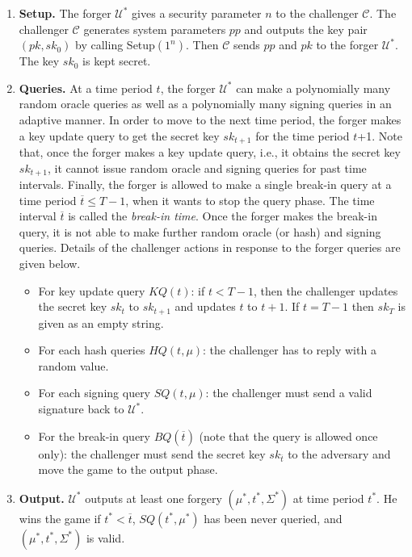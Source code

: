 \documentclass[runningheads]{llncs}
\begin{document}
\begin{enumerate}
\item \textbf{Setup.} The forger $\mathcal{U}^*$ gives a security parameter $n$ to the challenger $\mathcal{C}$. 
	The challenger $\mathcal{C}$ generates system parameters $pp$ and outputs the key pair $(pk, sk_0)$ 
	by calling \textsf{Setup}$(1^{n})$. 
	Then $\mathcal{C}$ sends $pp$ and  $pk$ to the forger $\mathcal{U}^*$. The key $sk_0$ is kept secret.
\item \textbf{Queries.} 
	At a time period $t$, the forger $\mathcal{U}^*$ can make a polynomially many random oracle queries 
	as well as a polynomially many signing queries in an adaptive manner.  
	In order to move to the next time period, the forger makes a key update query to get the secret key $sk_{t+1}$
	for the time period {$t$+1}.  
	Note that, once the forger makes a key update query, 
	i.e., it obtains the secret key $sk_{t+1}$, it cannot issue random oracle and signing queries 
	for past time intervals.
	Finally, the forger is allowed to make a single break-in query  
	at a time period $\overline{t}\leq T-1$, when it wants to stop the query phase.
	The time interval $\overline{t}$ is called the \textit{break-in time}.
	Once the forger makes the break-in query, it is not able to make further 
	random oracle (or hash) and signing queries.  
	Details of the challenger actions in response to the forger queries are given below.
	 \begin{itemize}
	\item For key update query $KQ(t)$: if $t <T-1$, then the challenger updates the secret key $sk_t$ to $sk_{t+1}$ 
	and updates $t$ to $t+1$. If $t=T-1$ then $sk_T$ is given as an empty string. 
	\item For each hash queries $HQ(t,\mu)$: the challenger has to reply with a random value. 
	\item For each signing query $SQ(t,\mu)$: the challenger must send a valid signature back to $\mathcal{U}^*$.
	\item For the break-in query $BQ(\overline{t})$ (note that the query is allowed once only): 
	the challenger must send  the secret key $sk_{\overline{t}}$ to the adversary and move the game to the output phase. 
	\end{itemize}
\item \textbf{Output.} $\mathcal{U}^*$ outputs at least one forgery  $ (\mu^*, t^*, \Sigma^*)$ at time period  $t^*$. He wins the game if $t^*< \overline{t}$, $SQ(t^*,\mu^*)$ has been never queried, and $(\mu^*, t^*, \Sigma^*)$ is valid.	
\end{enumerate}
\end{document}
